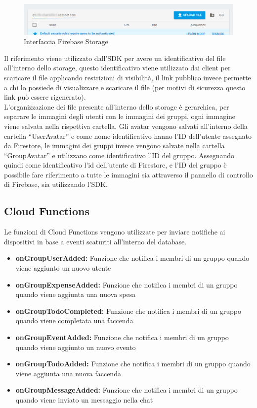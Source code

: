 \begin{figure}[!hb]
  \centering
  \includegraphics[width=1\textwidth]{immagini/firebase_storage.png}
  \caption{Interfaccia Firebase Storage}\label{fig:Interfaccia Firebase Storage}
\end{figure}

Il riferimento viene utilizzato dall'SDK per avere un identificativo del file all'interno dello storage, questo identificativo viene utilizzato dai client per scaricare il file applicando restrizioni di visibilità, il link pubblico invece permette a chi lo possiede di visualizzare e scaricare il file (per motivi di sicurezza questo link può essere rigenerato).\\
L'organizzazione dei file presente all'interno dello storage è gerarchica, per separare le immagini degli utenti con le immagini dei gruppi, ogni immagine viene salvata nella rispettiva cartella. Gli avatar vengono salvati all'interno della cartella ``UserAvatar'' e come nome identificativo hanno l'ID dell'utente assegnato da Firestore, le immagini dei gruppi invece vengono salvate nella cartella ``GroupAvatar'' e utilizzano come identificativo l'ID del gruppo.
Assegnando quindi come identificativo l'id dell'utente di Firestore, e l'ID del gruppo  è possibile fare riferimento a tutte le immagini sia attraverso il pannello di controllo di Firebase, sia utilizzando l'SDK.\\




\subsection{Cloud Functions}
Le funzioni di Cloud Functions vengono utilizzate per inviare notifiche ai dispositivi in base a eventi scaturiti all'interno del database.

\begin{itemize}
    \item \textbf{onGroupUserAdded:} Funzione che notifica i membri di un gruppo quando viene aggiunto un nuovo utente
    \item \textbf{onGroupExpenseAdded:} Funzione che notifica i membri di un gruppo quando viene aggiunta una nuova spesa
    \item \textbf{onGroupTodoCompleted:} Funzione che notifica i membri di un gruppo quando viene completata una faccenda
    \item \textbf{onGroupEventAdded:} Funzione che notifica i membri di un gruppo quando viene aggiunto un nuovo evento
    \item \textbf{onGroupTodoAdded:} Funzione che notifica i membri di un gruppo quando viene aggiunta una nuova faccenda
    \item \textbf{onGroupMessageAdded:} Funzione che notifica i membri di un gruppo quando viene inviato un messaggio nella chat
\end{itemize}


